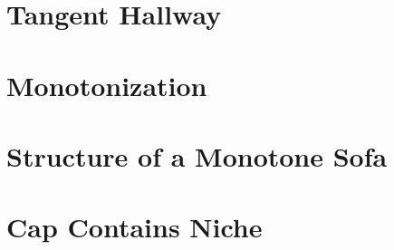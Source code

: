 
\section{Tangent Hallway}
\label{sec:tangent-hallway}


\section{Monotonization}
\label{sec:monotonization}


\section{Structure of a Monotone Sofa}
\label{sec:structure-of-a-monotone-sofa}


\section{Cap Contains Niche}
\label{sec:cap-contains-niche}


